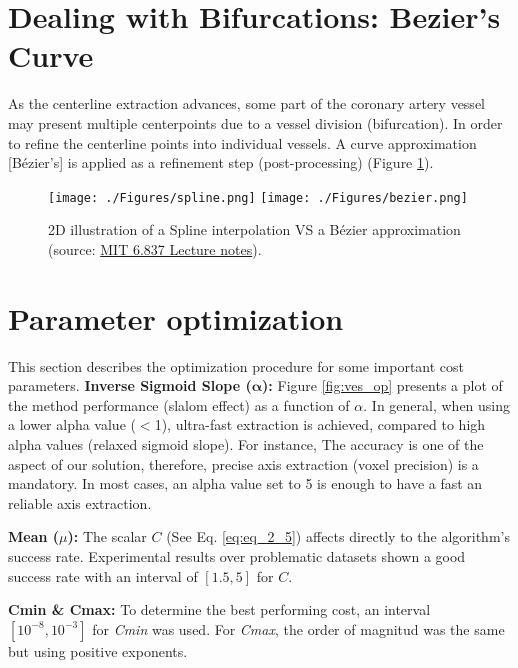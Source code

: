 \section{Dealing with Bifurcations: Bezier's Curve}\label{cent:bezi}

As the centerline extraction advances, some part of the coronary artery vessel may present multiple centerpoints due to a vessel division (bifurcation). In order to refine the centerline points into individual vessels. A curve approximation [B\'ezier's] is applied as a refinement step (post-processing) (Figure \ref{fig:sp_vs_bz}). 

\begin{figure}[ht]
	\centering
		\texttt{[image: ./Figures/spline.png]}
		\texttt{[image: ./Figures/bezier.png]}
	\caption[Spline interpolation VS B\'ezier approximation]{2D illustration of a Spline interpolation VS a B\'ezier approximation  (source: \href{http://ocw.mit.edu/courses/electrical-engineering-and-computer-science/6-837-computer-graphics-fall-2003/index.htm}{MIT 6.837 Lecture notes}).}
	\label{fig:sp_vs_bz}
\end{figure}


\section{Parameter optimization}\label{cent:opt}

This section describes the optimization procedure for some important cost parameters.
\textbf{Inverse Sigmoid Slope (}$\mathbf{\alpha}$\textbf{):} Figure \ref{fig:ves_op} presents a plot of the method performance (slalom effect) as a function of $\alpha$. In general, when using a lower alpha value ($<$1), ultra-fast extraction is achieved, compared to high alpha values (relaxed sigmoid slope). For instance, The accuracy is one of the aspect of our solution, therefore, precise axis extraction (voxel precision) is a mandatory. In most cases, an alpha value set to 5 is enough to have a fast an reliable axis extraction.

\textbf{Mean (}$\mu$\textbf{):} The scalar $C$ (See Eq. \ref{eq:eq_2_5}) affects directly to the algorithm's success rate. Experimental results over problematic datasets shown a good success rate with an interval of $\left[1.5 ,5\right] $ for $C$.

\textbf{Cmin \& Cmax:} To determine the best performing cost, an interval $\left[  10^{-8}, 10^{-3}\right]$ for \textit{Cmin} was used. For \textit{Cmax}, the order of magnitud was the same but using positive exponents.

